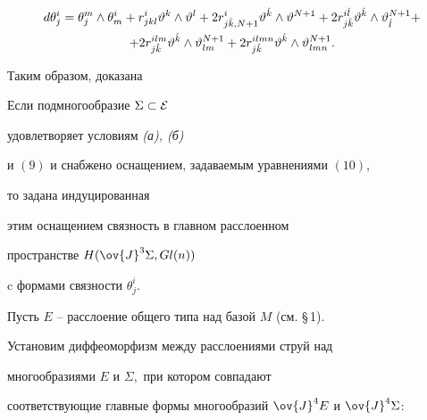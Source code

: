 \begin{multline*}


d\theta^i_j=\theta^m_j\wedge\theta^i_m+r^i_{jkl}\vartheta^k


\wedge\vartheta^l+2r^i_{j\Hat{k},N+1}


\vartheta^{\Hat{k}}\wedge\vartheta^{N+1}+2r^{i\Hat{l}}_{j\Hat{k}}


\vartheta^{\Hat{k}}\wedge\vartheta^{N+1}_{\Hat{l}}+ \\


%


+2r^{ilm}_{j\Hat{k}}\vartheta^{\Hat{k}}\wedge\vartheta^{N+1}_{lm}+


2r^{ilmn}_{j\Hat{k}}\vartheta^{\Hat{k}}\wedge\vartheta^{N+1}_{lmn}.


\end{multline*}





Таким образом, доказана





\begin{lem}


Если подмногообразие $\Sigma\subset\cal E$


удовлетворяет условиям {\em (а), (б)}


и $(9)$ и снабжено оснащением, задаваемым уравнениями $(10)$,


то задана индуцированная


этим оснащением связность в главном расслоенном 


пространстве $H(\ov{J}^3\Sigma,Gl(n))$


c формами связности $\theta^i_j.$


\end{lem}





Пусть $E$ -- расслоение общего типа над базой $M$ (см. \S\,1).


Установим диффеоморфизм между расслоениями струй над 


многообразиями $E$ и $\Sigma,$ при котором совпадают


соответствующие главные формы многообразий $\ov{J}^4E$ и $\ov{J}^4\Sigma$:


